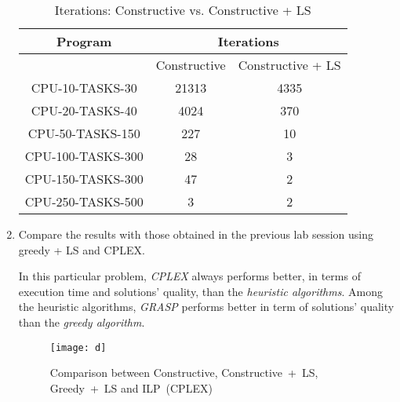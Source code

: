 \documentclass[12pt, a4paper]{article}
\begin{document}
\begin{enumerate}[label=(\alph*)]
    \begin{table}[H]
    \centering
    \begin{tabular}{|c|c|c|}
      \hline
      Program           & \multicolumn{2}{c|}{Iterations}  \\ \hline
                        & Constructive & Constructive + LS \\ \hline
      CPU-10-TASKS-30   & 21313        & 4335              \\ \hline
      CPU-20-TASKS-40   & 4024         & 370               \\ \hline
      CPU-50-TASKS-150  & 227          & 10                \\ \hline
      CPU-100-TASKS-300 & 28           & 3                 \\ \hline
      CPU-150-TASKS-300 & 47           & 2                 \\ \hline
      CPU-250-TASKS-500 & 3            & 2                 \\ \hline
    \end{tabular}
    \caption{Iterations: Constructive vs. Constructive + LS}
    \label{tab:c}
    \end{table}

    \newpage
    \item[\textcolor{QuestionBlue}{\textbullet}] \textcolor{QuestionBlue}{Compare the results with those obtained in the previous lab session using greedy + LS and CPLEX.}

    In this particular problem, \textit{CPLEX} always performs better, in terms of execution time and solutions' quality, than the \textit{heuristic algorithms}. Among the heuristic algorithms, \textit{GRASP} performs better in term of solutions' quality than the \textit{greedy algorithm}.

    \begin{figure}[H]
      \texttt{[image: d]}
      \caption{Comparison between Constructive, \mbox{Constructive + LS}, \mbox{Greedy + LS} and \mbox{ILP (CPLEX)}}
      \label{fig:d}
    \end{figure}

\end{enumerate}
\end{document}
